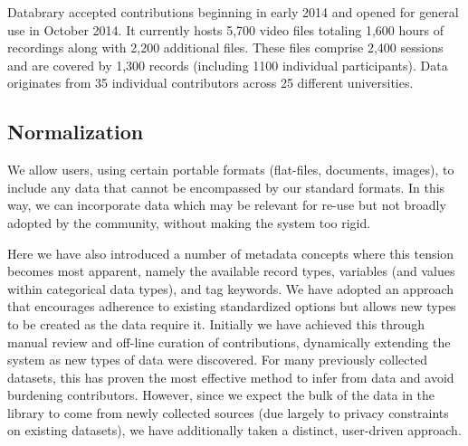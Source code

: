 \documentclass{sig-alternate}
\begin{document}
Databrary accepted contributions beginning in early 2014 and opened for general use in October 2014.
It currently hosts 5,700 video files totaling 1,600 hours of recordings along with 2,200 additional files.
These files comprise 2,400 sessions and are covered by 1,300 records (including 1100 individual participants).
Data originates from 35 individual contributors across 25 different universities.

\subsection{Normalization}


We allow users, using certain portable formats (flat-files, documents, images), to include any data that cannot be encompassed by our standard formats.
In this way, we can incorporate data which may be relevant for re-use but not broadly adopted by the community, without making the system too rigid.

Here we have also introduced a number of metadata concepts where this tension becomes most apparent, namely the available record types, variables (and values within categorical data types), and tag keywords.
We have adopted an approach that encourages adherence to existing standardized options but  allows new types to be created as the data require it.
Initially we have achieved this through manual review and off-line curation of contributions, dynamically extending the system as new types of data were discovered.
For many previously collected datasets, this has proven the most effective method to infer from data and avoid burdening contributors.
However, since we expect the bulk of the data in the library to come from newly collected sources (due largely to privacy constraints on existing datasets), we have additionally taken a distinct, user-driven approach.
\end{document}
